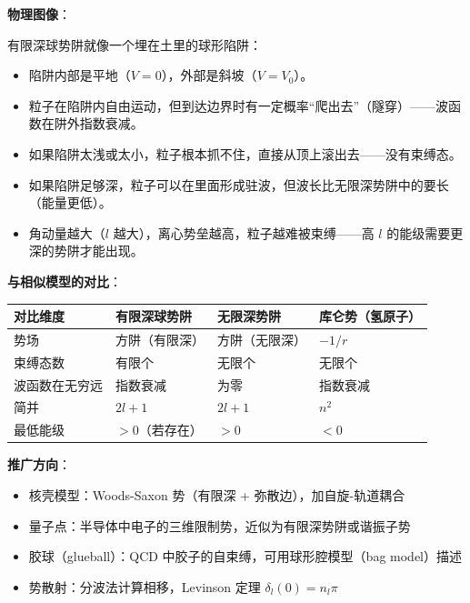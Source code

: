 \begin{insightbox}[物理图像与模型关联]
\textbf{物理图像}：

有限深球势阱就像一个埋在土里的球形陷阱：
\begin{itemize}[nosep]
    \item 陷阱内部是平地（$V=0$），外部是斜坡（$V=V_0$）。
    \item 粒子在陷阱内自由运动，但到达边界时有一定概率``爬出去''（隧穿）——波函数在阱外指数衰减。
    \item 如果陷阱太浅或太小，粒子根本抓不住，直接从顶上滚出去——没有束缚态。
    \item 如果陷阱足够深，粒子可以在里面形成驻波，但波长比无限深势阱中的要长（能量更低）。
    \item 角动量越大（$l$ 越大），离心势垒越高，粒子越难被束缚——高 $l$ 的能级需要更深的势阱才能出现。
\end{itemize}

\textbf{与相似模型的对比}：
\begin{center}
\begin{tabular}{llll}
\toprule
\textbf{对比维度} & \textbf{有限深球势阱} & \textbf{无限深势阱} & \textbf{库仑势（氢原子）} \\
\midrule
势场 & 方阱（有限深） & 方阱（无限深） & $-1/r$ \\
束缚态数 & 有限个 & 无限个 & 无限个 \\
波函数在无穷远 & 指数衰减 & 为零 & 指数衰减 \\
简并 & $2l+1$ & $2l+1$ & $n^2$ \\
最低能级 & $>0$（若存在） & $>0$ & $<0$ \\
\bottomrule
\end{tabular}
\end{center}

\textbf{推广方向}：
\begin{itemize}[nosep]
    \item 核壳模型：Woods-Saxon 势（有限深 + 弥散边），加自旋-轨道耦合
    \item 量子点：半导体中电子的三维限制势，近似为有限深势阱或谐振子势
    \item 胶球（glueball）：QCD 中胶子的自束缚，可用球形腔模型（bag model）描述
    \item 势散射：分波法计算相移，Levinson 定理 $\delta_l(0)=n_l\pi$
\end{itemize}
\end{insightbox}

